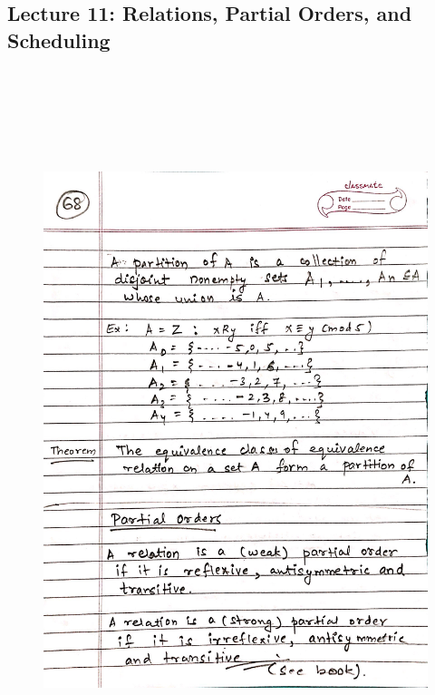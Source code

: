 \newpage
{\color{black} \subsection*{Lecture 11: Relations, Partial Orders, and Scheduling}}
\begin{figure}[H]
    \centering
    \includegraphics[width=16cm, height=21cm]{"./MIT-6.042J/MIT-6042J-068"}
\end{figure}

